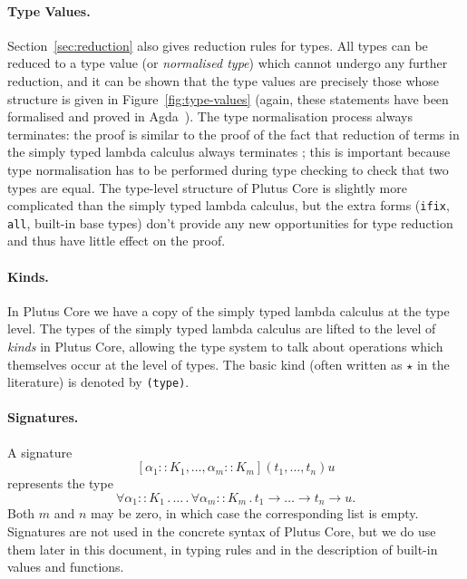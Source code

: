 \documentclass[a4paper]{article}
\begin{document}
\paragraph{Type Values.} Section~\ref{sec:reduction} also gives
reduction rules for types.  All types can be reduced to a type value
(or \textit{normalised type}) which cannot undergo any further
reduction, and it can be shown that the type values are precisely
those whose structure is given in Figure~\ref{fig:type-values} (again,
these statements have been formalised and proved in
Agda~\citep{Agda}).  The type normalisation process always terminates:
the proof is similar to the proof of the fact that reduction of terms
in the simply typed lambda calculus always
terminates \citep[\S12]{Pierce:TAPL}; this is important because type
normalisation has to be performed during type checking to check that
two types are equal. The type-level structure of Plutus Core is
slightly more complicated than the simply typed lambda calculus, but
the extra forms (\texttt{ifix}, \texttt{all}, built-in base types)
don't provide any new opportunities for type reduction and thus have
little effect on the proof.

\paragraph{Kinds.} In Plutus Core we have a copy of the
simply typed lambda calculus at the type level. The types of the
simply typed lambda calculus are lifted to the level of
\textit{kinds} in Plutus Core, allowing the type system to talk about
operations which themselves occur at the level of types.  The basic
kind (often written as $\star$ in the literature) is denoted
by \texttt{(type)}.

\paragraph{Signatures.}  A signature
$$[\alpha_1::K_1, \ldots, \alpha_m::K_m](t_1, \ldots, t_n)u$$ represents
the type
$$\forall \alpha_1::K_1\,.\, \ldots \,.\, \forall \alpha_m::K_m\,.\, t_1
\rightarrow \ldots \rightarrow t_n \rightarrow u.$$
Both $m$ and $n$
may be zero, in which case the corresponding list is empty.
Signatures are not used in the concrete syntax of Plutus Core, but we
do use them later in this document, in typing rules and in the
description of built-in values and functions.
\end{document}
